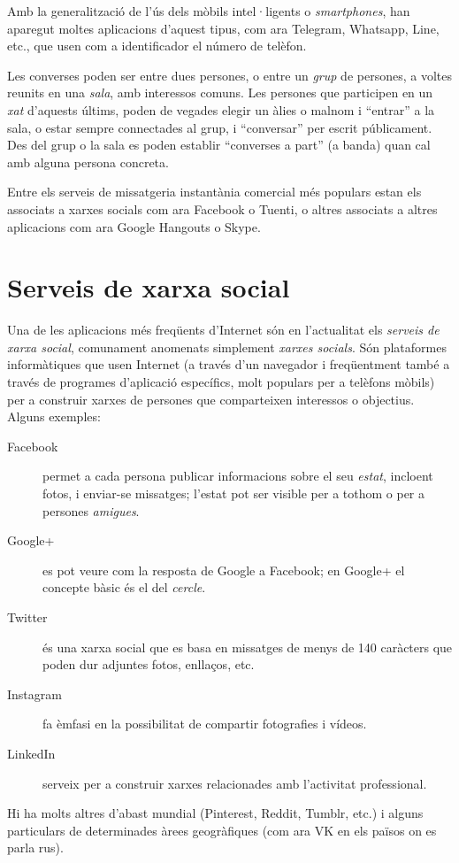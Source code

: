 Amb la generalització de l'ús dels mòbils intel·ligents o
\emph{smartphones}, han aparegut moltes aplicacions d'aquest tipus,
com ara Telegram, Whatsapp, Line, etc., que usen com a identificador
el número de telèfon.

Les converses poden ser entre dues persones, o entre un \emph{grup} de
persones, a voltes reunits en una \emph{sala}, amb interessos comuns.
Les persones que participen en un \emph{xat} d'aquests últims, poden
de vegades elegir un àlies o malnom i ``entrar'' a la sala, o estar
sempre connectades al grup, i ``conversar'' per escrit
públicament. Des del grup o la sala es poden establir ``converses a
part'' (a banda) quan cal amb alguna persona concreta.

Entre els serveis de missatgeria instantània comercial més populars
estan els associats a xarxes socials com ara Facebook o Tuenti, o
altres associats a altres aplicacions com ara Google Hangouts o Skype.

\section{Serveis de xarxa social}
\label{ss:xarsessocials}
Una de les aplicacions més freqüents d'Internet són en l'actualitat
els \emph{serveis de xarxa social}, comunament anomenats simplement
\emph{xarxes socials}. Són plataformes informàtiques que usen Internet
(a través d'un navegador i freqüentment també a través de programes
d'aplicació específics, molt populars per a telèfons mòbils) per a
construir xarxes de persones que comparteixen interessos o
objectius. Alguns exemples:
\begin{description}
\item[Facebook] permet a cada persona publicar informacions sobre el
  seu \emph{estat}, incloent fotos, i enviar-se missatges; l'estat pot
  ser visible per a tothom o per a persones \emph{amigues}.
\item[Google+] es pot veure com la resposta de Google a Facebook; en
  Google+ el concepte bàsic és el del \emph{cercle}.
\item[Twitter] és una xarxa social que es basa en missatges de menys
  de 140 caràcters que poden dur adjuntes fotos, enllaços, etc.
\item[Instagram] fa èmfasi en la possibilitat de compartir fotografies
  i vídeos.
\item[LinkedIn] serveix per a construir xarxes relacionades amb
  l'activitat professional.
\end{description}
Hi ha molts altres d'abast mundial (Pinterest, Reddit, Tumblr, etc.) i
alguns particulars de determinades àrees geogràfiques (com ara VK en
els països on es parla rus).

